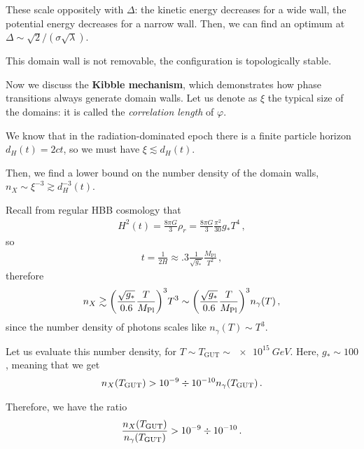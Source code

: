 \documentclass[main.tex]{subfiles}
\begin{document}

These scale oppositely with \(\Delta \): the kinetic energy decreases for a wide wall, the potential energy decreases for a narrow wall. 
Then, we can find an optimum at \(\Delta \sim \sqrt{2} / (\sigma \sqrt{\lambda })\). 

This domain wall is not removable, the configuration is topologically stable. 

Now we discuss the \textbf{Kibble mechanism}, which demonstrates how phase transitions always generate domain walls. 
Let us denote as \(\xi \) the typical size of the domains: it is called the \emph{correlation length} of \(\varphi \). 

We know that in the radiation-dominated epoch there is a finite particle horizon \(d_H(t) = 2 ct\), so we must have \(\xi \lesssim d_H (t)\). 

Then, we find a lower bound on the number density of the domain walls, \(n_X \sim \xi^{-3} \gtrsim d_H^{-3}(t)\). 

Recall from regular HBB cosmology that 
%
\begin{align}
H^2(t) = \frac{8 \pi G}{3} \rho _r = \frac{8 \pi G}{3} \frac{\pi^2}{30} g_* T^{4}
\,,
\end{align}
%
so 
%
\begin{align}
t = \frac{1}{2 H} \approx \num{.3} \frac{1}{\sqrt{g_*}} \frac{M _{\text{Pl}}}{T^2}
\,,
\end{align}
%
therefore 
%
\begin{align}
n_X \gtrsim \qty(\frac{\sqrt{g_*}}{\num{.6}} \frac{T}{M _{\text{Pl}}})^3 T^3 \sim \qty(\frac{\sqrt{g_*}}{\num{.6}} \frac{T}{ M _{\text{Pl}}})^3 n_\gamma (T)
\,,
\end{align}
%
since the number density of photons scales like \(n_\gamma (T) \sim T^3\).

Let us evaluate this number density, for \(T \sim T _{\text{GUT}} \sim \SI{e15}{GeV}\).
Here, \(g_* \sim 100\), meaning that we get 
%
\begin{align}
n_X (T _{\text{GUT}}) > \num{e-9} \divisionsymbol \num{e-10} n_\gamma (T _{\text{GUT}})
\,.
\end{align}

Therefore, we have the ratio 
%
\begin{align}
\frac{n_X (T _{\text{GUT}})}{n_\gamma (T _{\text{GUT}})} > \num{e-9} \divisionsymbol \num{e-10}
\,.
\end{align}
\end{document}
